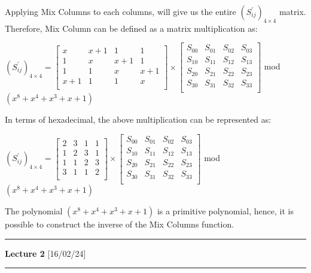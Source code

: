 \documentclass[11pt]{article}
\begin{document}
Applying Mix Columns to each columns, will give us the entire $(S_{ij}^{'})_{4 \times 4}$ matrix. Therefore, Mix Column can be defined as a matrix multiplication as:
\begin{center}
    $
    (S_{ij}^{'})_{4 \times 4} = 
    \begin{bmatrix}
        x & x + 1 & 1 & 1\\
        1 & x & x+1 & 1\\
        1 & 1 & x & x+1\\
        x+1 & 1 & 1 & x\\
    \end{bmatrix}
    \times
    \begin{bmatrix}
        S_{00} & S_{01} & S_{02} & S_{03}\\
        S_{10} & S_{11} & S_{12} & S_{13}\\
        S_{20} & S_{21} & S_{22} & S_{23}\\
        S_{30} & S_{31} & S_{32} & S_{33}\\
    \end{bmatrix}
    $
    mod $(x^8 + x^4 + x^3 + x + 1)$
\end{center}
In terms of hexadecimal, the above multiplication can be represented as:
\begin{center}
    $
    (S_{ij}^{'})_{4 \times 4} = 
    \begin{bmatrix}
        2 & 3 & 1 & 1\\
        1 & 2 & 3 & 1\\
        1 & 1 & 2 & 3\\
        3 & 1 & 1 & 2\\
    \end{bmatrix}
    \times
    \begin{bmatrix}
        S_{00} & S_{01} & S_{02} & S_{03}\\
        S_{10} & S_{11} & S_{12} & S_{13}\\
        S_{20} & S_{21} & S_{22} & S_{23}\\
        S_{30} & S_{31} & S_{32} & S_{33}\\
    \end{bmatrix}
    $
    mod $(x^8 + x^4 + x^3 + x + 1)$
\end{center}

The polynomial $(x^8 + x^4 + x^3 + x + 1)$ is a primitive polynomial, hence, it is possible to construct the inverse of the Mix Columns function.\\
\newpage

\rule{\textwidth}{1pt}
\begin{center}
    \textbf{Lecture 2} [16/02/24]
\end{center}
\rule{\textwidth}{1pt}
\end{document}
